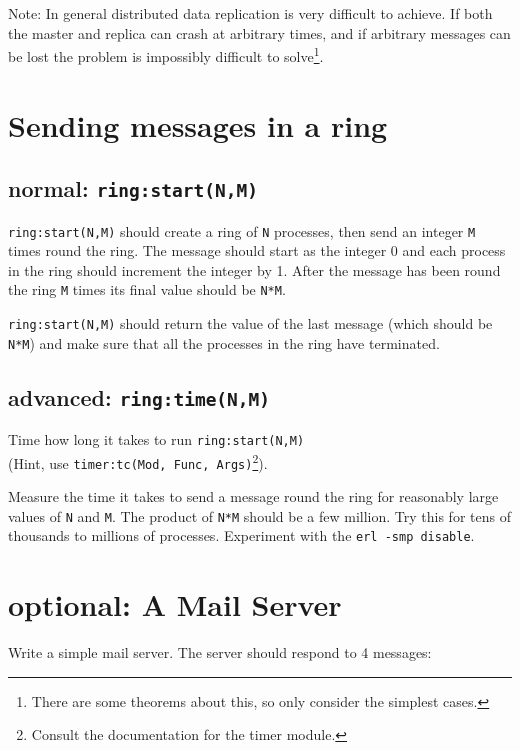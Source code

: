 \documentclass[12pt]{hitec}
\begin{document}
Note: In general distributed data replication is very difficult to
achieve.  If both the master and replica can crash at arbitrary times,
and if arbitrary messages can be lost the problem is impossibly
difficult to solve\footnote{There are some theorems about this, so only consider
the simplest cases.}.

\section{Sending messages in a ring}

\subsection{normal: \texttt{ring:start(N,M)}}

\verb+ring:start(N,M)+ should create a ring of \verb+N+ processes,
then send an integer \verb+M+ times round the ring. The message should
start as the integer 0 and each process in the ring should increment
the integer by 1.  After the message has been round the ring \verb+M+
times its final value should be \verb+N*M+. 

\verb+ring:start(N,M)+ should return the value of the last message
(which should be \verb+N*M+) and make sure that all the processes in
the ring have terminated.

\subsection{advanced: \texttt{ring:time(N,M)}}

Time how long it takes to run \verb+ring:start(N,M)+\\
(Hint, use
\verb+timer:tc(Mod, Func, Args)+\footnote{Consult the documentation for
  the timer module.}).

Measure the time it takes to send a message round the ring for
reasonably large values of \verb+N+ and \verb+M+. The product
of \verb+N*M+ should be a few million. Try this for tens of thousands to
millions of processes. Experiment with the \verb+erl -smp disable+.

\section{optional: A Mail Server}

Write a simple mail server. The server should respond to 4 messages:
\end{document}
